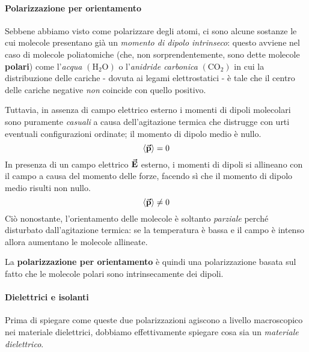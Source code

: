 \paragraph{Polarizzazione per orientamento}
Sebbene abbiamo visto come polarizzare degli atomi, ci sono alcune sostanze le cui molecole presentano già un \textit{momento di dipolo intrinseco}: questo avviene nel caso di molecole poliatomiche (che, non sorprendentemente, sono dette molecole \textbf{polari}) come l'\textit{acqua} $\left(\mathrm{H}_2\mathrm{O}\right)$ o l'\textit{anidride carbonica} $\left(\mathrm{CO}_2\right)$ in cui la distribuzione delle cariche - dovuta ai legami elettrostatici - è tale che il centro delle cariche negative \textit{non} coincide con quello positivo.

Tuttavia, in assenza di campo elettrico esterno i momenti di dipoli molecolari sono puramente \textit{casuali} a causa dell'agitazione termica che distrugge con urti eventuali configurazioni ordinate; il momento di dipolo medio è nullo.
\begin{equation*}
	\left<\vb*{\va{p}}\right>=0
\end{equation*}
In presenza di un campo elettrico $\vb*{\va{E}}$ esterno, i momenti di dipoli si allineano con il campo a causa del momento delle forze, facendo sì che il momento di dipolo medio risulti non nullo.
\begin{equation*}
	\left<\vb*{\va{p}}\right>\neq0
\end{equation*}
Ciò nonostante, l'orientamento delle molecole è soltanto \textit{parziale} perché disturbato dall'agitazione termica: se la temperatura è bassa e il campo è intenso allora aumentano le molecole allineate.

La \textbf{polarizzazione per orientamento} è quindi una polarizzazione basata sul fatto che le molecole polari sono intrinsecamente dei dipoli.
\paragraph{Dielettrici e isolanti}
Prima di spiegare come queste due polarizzazioni agiscono a livello macroscopico nei materiale dielettrici, dobbiamo effettivamente spiegare cosa sia un \textit{materiale dielettrico}.

